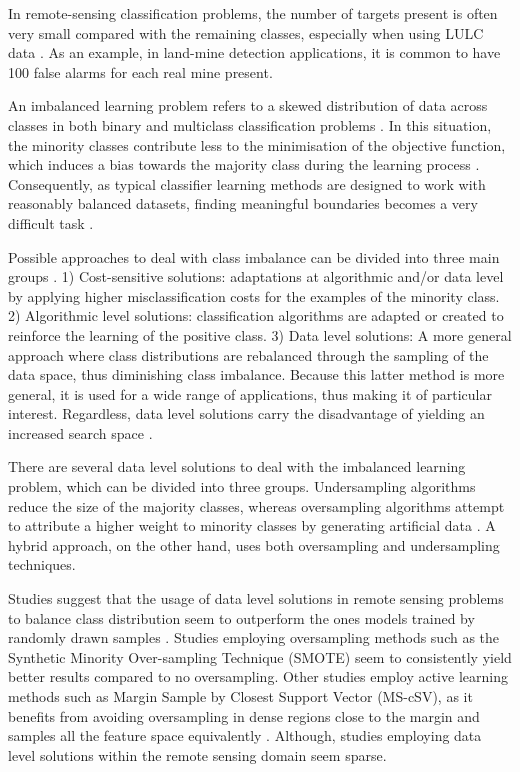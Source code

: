 \documentclass[parskip=full]{scrartcl}
\begin{document}
In remote-sensing classification problems, the number of targets present is often very small compared with the remaining classes, especially when using LULC data \cite{Williams2009, Cenggoro2018}. As an example, in land-mine detection applications, it is common to have 100 false alarms for each real mine present.

An imbalanced learning problem refers to a skewed distribution of data across classes in both binary and multiclass classification problems \cite{Abdi2016}. In this situation, the minority classes contribute less to the minimisation of the objective function, which induces a bias towards the majority class during the learning process \cite{Douzas2019}. Consequently, as typical classifier learning methods are designed to work with reasonably balanced datasets, finding meaningful boundaries becomes a very difficult task \cite{Saez2016}.

Possible approaches to deal with class imbalance can be divided into three main groups \cite{Fernandez2013}. 1) Cost-sensitive solutions: adaptations at algorithmic and/or data level by applying higher misclassification costs for the examples of the minority class. 2) Algorithmic level solutions: classification algorithms are adapted or created to reinforce the learning of the positive class. 3) Data level solutions: A more general approach where class distributions are rebalanced through the sampling of the data space, thus diminishing class imbalance. Because this latter method is more general, it is used for a wide range of applications, thus making it of particular interest. Regardless, data level solutions carry the disadvantage of yielding an increased search space \cite{Fernandez2013}.

There are several data level solutions to deal with the imbalanced learning problem, which can be divided into three groups. Undersampling algorithms reduce the size of the majority classes, whereas oversampling algorithms attempt to attribute a higher weight to minority classes by generating artificial data \cite{Mellor2015}. A hybrid approach, on the other hand, uses both oversampling and undersampling techniques.

Studies suggest that the usage of data level solutions in remote sensing problems to balance class distribution seem to outperform the ones models trained by randomly drawn samples \cite{Wang2019, Mellor2015}.  Studies employing oversampling methods such as the Synthetic Minority Over-sampling Technique (SMOTE) \cite{Chawla2002} seem to consistently yield better results \cite{Johnson2013, Geib2015} compared to no oversampling. Other studies employ active learning methods such as Margin Sample by Closest Support Vector (MS-cSV), as it benefits from avoiding oversampling in dense regions close to the margin and samples all the feature space equivalently \cite{Tuia2009}. Although, studies employing data level solutions within the remote sensing domain seem sparse.
\end{document}
